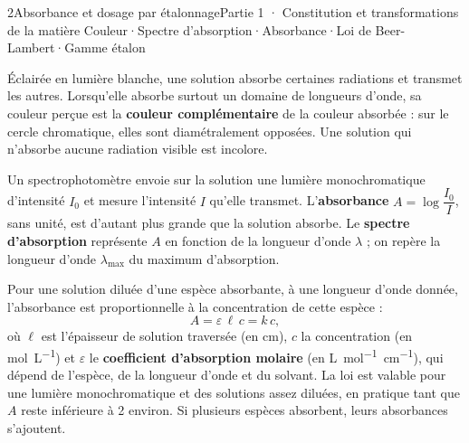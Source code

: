 \begin{ouverture}[spectre]{2}{Absorbance et dosage par étalonnage}{Partie 1 · Constitution et transformations de la matière}
{Couleur\enspace·\enspace Spectre d'absorption\enspace·\enspace Absorbance\enspace·\enspace Loi de Beer-Lambert\enspace·\enspace Gamme étalon}
\end{ouverture}
\essentiel
{}
\begin{definition}
Éclairée en lumière blanche, une solution absorbe certaines radiations et transmet les autres. Lorsqu'elle absorbe
surtout un domaine de longueurs d'onde, sa couleur perçue est la \textbf{couleur complémentaire} de la couleur absorbée :
sur le cercle chromatique, elles sont diamétralement opposées. Une solution qui n'absorbe aucune radiation visible est
incolore.
\end{definition}
\begin{definition}[Absorbance]
Un spectrophotomètre envoie sur la solution une lumière monochromatique d'intensité $I_0$ et mesure l'intensité $I$ qu'elle
transmet. L'\textbf{absorbance} $A=\log\dfrac{I_0}{I}$, sans unité, est d'autant plus grande que la solution absorbe. Le
\textbf{spectre d'absorption} représente $A$ en fonction de la longueur d'onde $\lambda$ ; on repère la longueur d'onde $\lambda_{\max}$ du
maximum d'absorption.
\end{definition}
\begin{loi}
Pour une solution diluée d'une espèce absorbante, à une longueur d'onde donnée, l'absorbance est proportionnelle à la
concentration de cette espèce :
\[A=\varepsilon\,\ell\,c=k\,c,\]
où $\ell$ est l'épaisseur de solution traversée (en cm), $c$ la concentration (en \unit{mol.L^{-1}}) et $\varepsilon$ le \textbf{coefficient
d'absorption molaire} (en \unit{L.mol^{-1}.cm^{-1}}), qui dépend de l'espèce, de la longueur d'onde et du solvant. La loi est valable
pour une lumière monochromatique et des solutions assez diluées, en pratique tant que $A$ reste inférieure à 2 environ.
Si plusieurs espèces absorbent, leurs absorbances s'ajoutent.
\end{loi}
